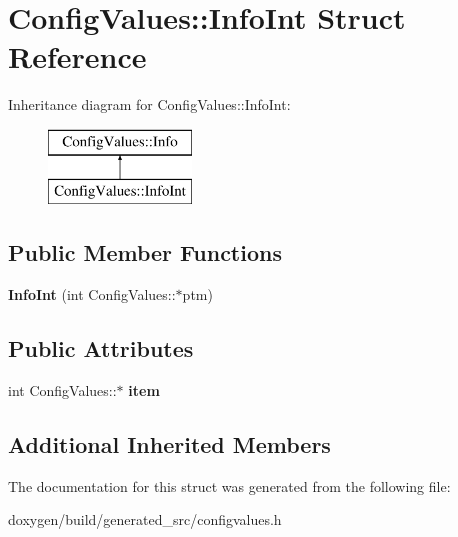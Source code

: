 \hypertarget{struct_config_values_1_1_info_int}{}\section{Config\+Values\+::Info\+Int Struct Reference}
\label{struct_config_values_1_1_info_int}
Inheritance diagram for Config\+Values\+::Info\+Int\+:\begin{figure}[H]
\begin{center}
\leavevmode
\includegraphics[height=2.000000cm]{struct_config_values_1_1_info_int}
\end{center}
\end{figure}
\subsection*{Public Member Functions}
\begin{DoxyCompactItemize}
\item 
\mbox{\label{struct_config_values_1_1_info_int_a146b85d902442d6f2e2ad67c86a53728}} 
{\bfseries Info\+Int} (int Config\+Values\+::$\ast$ptm)
\end{DoxyCompactItemize}
\subsection*{Public Attributes}
\begin{DoxyCompactItemize}
\item 
\mbox{\label{struct_config_values_1_1_info_int_a7569d4e766e2515d2ca85f8c716b624e}} 
int Config\+Values\+::$\ast$ {\bfseries item}
\end{DoxyCompactItemize}
\subsection*{Additional Inherited Members}


The documentation for this struct was generated from the following file\+:\begin{DoxyCompactItemize}
\item 
doxygen/build/generated\+\_\+src/configvalues.\+h\end{DoxyCompactItemize}
